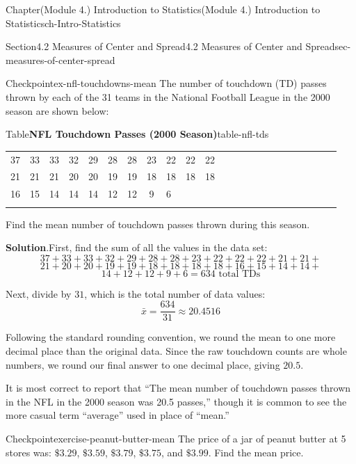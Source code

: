 \documentclass[oneside,10pt,]{book}
\newcommand{\blocktitlefont}{\relax}
\newcommand{\tabularfont}{\relax}
\newcommand{\hrulethin}  {\noalign{\hrule height 0.04em}}
\begin{document}
\begin{chapterptx}{Chapter}{(Module 4.) Introduction to Statistics}{}{(Module 4.) Introduction to Statistics}{}{}{ch-Intro-Statistics}
\begin{sectionptx}{Section}{4.2 Measures of Center and Spread}{}{4.2 Measures of Center and Spread}{}{}{sec-measures-of-center-spread}
\begin{inlineexercise}{Checkpoint}{}{ex-nfl-touchdowns-mean}
The number of touchdown (TD) passes thrown by each of the 31 teams in the National Football League in the 2000 season are shown below:%
\begin{tableptx}{Table}{\textbf{NFL Touchdown Passes (2000 Season)}}{table-nfl-tds}{}%
\centering%
{\tabularfont%
\begin{tabular}{AcAcAcAcAcAcAcAcAcAcAcA}\hrulethin
37&33&33&32&29&28&28&23&22&22&22\tabularnewline\hrulethin
21&21&21&20&20&19&19&18&18&18&18\tabularnewline\hrulethin
16&15&14&14&14&12&12&9&6&&\tabularnewline\hrulethin
\end{tabular}
}%
\end{tableptx}%
Find the mean number of touchdown passes thrown during this season.%
\par\smallskip%
\noindent\textbf{\blocktitlefont Solution}.\hypertarget{ex-nfl-touchdowns-mean-2}{}\quad{}First, find the sum of all the values in the data set:%
\begin{equation*}
37 + 33 + 33 + 32 + 29 + 28 + 28 + 23 + 22 + 22 + 22 + 21 + 21 + 
\end{equation*}
%
\begin{equation*}
21 + 20 + 20 + 19 + 19 + 18 + 18 + 18 + 18 + 16 + 15 + 14 + 14 + 
\end{equation*}
%
\begin{equation*}
14 + 12 + 12 + 9 + 6 = 634 \text{ total TDs}
\end{equation*}
%
\par
Next, divide by \(31\), which is the total number of data values:%
\begin{equation*}
\bar{x} = \dfrac{634}{31} \approx 20.4516
\end{equation*}
%
\par
Following the standard rounding convention, we round the mean to one more decimal place than the original data. Since the raw touchdown counts are whole numbers, we round our final answer to one decimal place, giving \(20.5\).%
\par
It is most correct to report that \textquotedblleft{}The mean number of touchdown passes thrown in the NFL in the 2000 season was 20.5 passes,\textquotedblright{} though it is common to see the more casual term \textquotedblleft{}average\textquotedblright{} used in place of \textquotedblleft{}mean.\textquotedblright{}%
\end{inlineexercise}%
\begin{inlineexercise}{Checkpoint}{}{exercise-peanut-butter-mean}%
The price of a jar of peanut butter at 5 stores was: \(\$3.29\), \(\$3.59\), \(\$3.79\), \(\$3.75\), and \(\$3.99\). Find the mean price.%

\end{inlineexercise}
\end{sectionptx}
\end{chapterptx}
\end{document}
